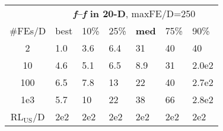 \begin{tabular}{c|llllll}
 & \multicolumn{6}{|c}{\textbf{\textit{f}\raisebox{-0.35ex}{1}--\textit{f}\raisebox{-0.35ex}{24} in 20-D}, maxFE/D=250}\\
\#FEs/D & best & 10\% & 25\% & \textbf{med} & 75\% & 90\%\\
2 & \hspace*{1ex}1.0 & \hspace*{1ex}3.6 & \hspace*{1ex}6.4 & 31 & 40 & 40\\
10 & \hspace*{1ex}4.6 & \hspace*{1ex}5.1 & \hspace*{1ex}6.5 & \hspace*{1ex}8.9 & 31 & 2.0e2\\
100 & \hspace*{1ex}6.5 & \hspace*{1ex}7.8 & 13 & 22 & 40 & 2.7e2\\
1e3 & \hspace*{1ex}5.7 & 10 & 22 & 38 & 66 & 2.8e2\\
$\text{RL}_{\text{US}}$/D & 2e2 & 2e2 & 2e2 & 2e2 & 2e2 & 2e2
\end{tabular}
